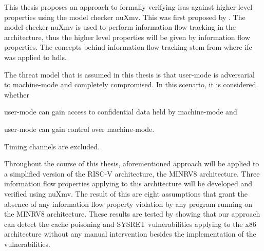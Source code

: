 
This thesis proposes an approach to formally verifying \glspl{isa} against higher level properties using the model checker nuXmv.
This was first proposed by \cite{Reid17}.
The model checker nuXmv is used to perform information flow tracking in the architecture, thus the higher level properties will be given by information flow properties.
The concepts behind information flow tracking stem from \cite{Ferraiuolo17} where \gls{ifc} was applied to \glspl{hdl}.

The threat model that is assumed in this thesis is that user-mode is adversarial to machine-mode and completely compromised.
In this scenario, it is considered whether
\begin{enumerate*}[label=\alph*)]
    \item user-mode can gain access to confidential data held by machine-mode and
    \item user-mode can gain control over machine-mode.
\end{enumerate*}
Timing channels are excluded.

Throughout the course of this thesis, aforementioned approach will be applied to a simplified version of the RISC-V architecture, the MINRV8 architecture.
Three information flow properties applying to this architecture will be developed and verified using nuXmv.
The result of this are eight assumptions that grant the absence of any information flow property violation by any program running on the MINRV8 architecture.
These results are tested by showing that our approach can detect the cache poisoning \cite{Wojtczuk09} and SYSRET vulnerabilities \cite{SYSRET-vuln,Dunlap19} applying to the x86 architecture without any manual intervention besides the implementation of the vulnerabilities.
